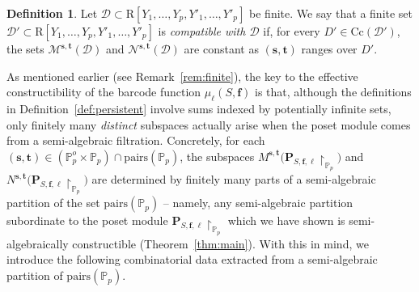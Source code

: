\documentclass{amsart}[10pts]
\theoremstyle{definition}
\newtheorem{definition}{Definition}[section]
\theoremstyle{remark}
\theoremstyle{observation}
\numberwithin{equation}{section}
\newcommand {\R} {\mathrm{R}}
\newcommand {\PP}     {\mathbb{P}} %
\newcommand{\Cc}{\mathrm{Cc}}
\newcommand{\Pairs}{\mathrm{pairs}}
\begin{document}
\begin{definition}
\label{property:alg:mu}
Let $\mathcal D\subset \R[Y_1,\ldots,Y_p,Y'_1,\ldots,Y'_p]$ be finite. 
We say that a finite set $\mathcal D'\subset \R[Y_1,\ldots,Y_p,Y'_1,\ldots,Y'_p]$ is \emph{compatible with $\mathcal D$} if, for every  $D'\in \Cc(\mathcal D')$, the sets $\mathcal M^{\mathbf s,\mathbf t}(\mathcal D)$ and $\mathcal N^{\mathbf s,\mathbf t}(\mathcal D)$ are constant as $(\mathbf s, \mathbf t)$ ranges over $D'$.
\end{definition}




As mentioned earlier (see Remark~\ref{rem:finite}), the key to the effective constructibility of the barcode function $\mu_\ell(S,\mathbf f)$ is that, although the definitions in Definition~\ref{def:persistent} involve sums indexed by potentially infinite sets, only finitely many \emph{distinct} subspaces actually arise when the poset module comes from a semi-algebraic filtration. Concretely, for each $(\mathbf s,\mathbf t)\in (\PP_p^o\times \PP_p)\cap \Pairs(\PP_p)$, the subspaces
$M^{\mathbf s,\mathbf t}\!\bigl(\mathbf P_{S,\mathbf f,\ell}\!\restriction_{\PP_p}\bigr)$ and
$N^{\mathbf s,\mathbf t}\!\bigl(\mathbf P_{S,\mathbf f,\ell}\!\restriction_{\PP_p}\bigr)$
are determined by finitely many 
parts of a semi-algebraic partition of the set $\Pairs(\PP_p)$ -- namely, any semi-algebraic partition subordinate to the poset module $\mathbf{P}_{S,\mathbf{f},\ell}\!\restriction_{\PP_p}$ which we have shown is 
semi-algebraically constructible (Theorem~\ref{thm:main}).
With this in mind, we introduce the following combinatorial data extracted from a semi-algebraic partition of $\Pairs(\PP_p)$.
\end{document}
